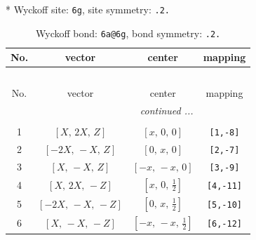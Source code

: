 \documentclass[fleqn,8pt]{jsarticle}
\begin{document}
* Wyckoff site: {\tt 6g}, site symmetry: {\tt .2.}
\renewcommand{\arraystretch}{1.2}
\begin{longtable}{cccc}
\caption{Wyckoff bond: {\tt 6a@6g}, bond symmetry: {\tt .2.}}
 \\
 \hline \hline
No. & vector & center & mapping \\ \hline \endfirsthead

\multicolumn{3}{l}{\tablename\ \thetable{}} \\
 \hline \hline
No. & vector & center & mapping \\ \hline \endhead

 \hline \hline
\multicolumn{3}{r}{\footnotesize\it continued ...} \\ \endfoot

 \hline \hline
\multicolumn{3}{r}{} \\ \endlastfoot

1 & $\left[ X,\, 2 X,\, Z \right]$ & $\left[ x,\, 0,\, 0 \right]$ & {\tt [1,-8]} \\ \hline
2 & $\left[ - 2 X,\, - X,\, Z \right]$ & $\left[ 0,\, x,\, 0 \right]$ & {\tt [2,-7]} \\ \hline
3 & $\left[ X,\, - X,\, Z \right]$ & $\left[ - x,\, - x,\, 0 \right]$ & {\tt [3,-9]} \\ \hline
4 & $\left[ X,\, 2 X,\, - Z \right]$ & $\left[ x,\, 0,\, \frac{1}{2} \right]$ & {\tt [4,-11]} \\ \hline
5 & $\left[ - 2 X,\, - X,\, - Z \right]$ & $\left[ 0,\, x,\, \frac{1}{2} \right]$ & {\tt [5,-10]} \\ \hline
6 & $\left[ X,\, - X,\, - Z \right]$ & $\left[ - x,\, - x,\, \frac{1}{2} \right]$ & {\tt [6,-12]} \\
\end{longtable}
\renewcommand{\arraystretch}{1.2}
\end{document}
